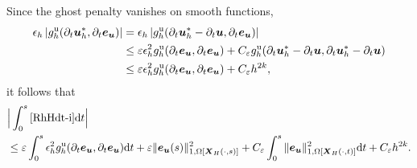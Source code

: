 \documentclass[11pt,reqno]{amsart}
\theoremstyle{definition}
\theoremstyle{plain}
\numberwithin{theorem}{section}
\numberwithin{proposition}{section}
\numberwithin{lemma}{section}
\numberwithin{equation}{section}
\newcommand{\bs}[1]{\boldsymbol{#1}}
\newcommand{\uu}[1]  {{\bs{#1}} }
\newcommand{\dep}{{{\bs{d}}}}
\def\d{\mathrm{d}}
\newcommand{\bu}{\uu{u}}
\renewcommand{\(}{\bigl(}
\renewcommand{\)}{\bigr)}
\begin{document}
Since the ghost penalty vanishes on smooth functions,
\begin{align*}
\epsilon_h
\left|
g_h^{\rm u}(\partial_t{\bs u}_h^*,\partial_t{\bs e}_{\bs u})
\right|
&=
\epsilon_h
\left|
g_h^{\rm u}(\partial_t{\bs u}_h^*-\partial_t{\bs u},
             \partial_t{\bs e}_{\bs u})
\right|
\\
&\leq 
\varepsilon \epsilon_h^2 
g_h^{\rm u}(\partial_t{\bs e}_{\bs u},\partial_t{\bs e}_{\bs u})
+ C_\varepsilon  g_h^{\rm u}(\partial_t{\bs u}_h^*-\partial_t{\bs u},\partial_t{\bs u}_h^*-\partial_t{\bs u}) \\
&\leq \varepsilon \epsilon_h^2 g_h^{\rm u}(\partial_t{\bs e}_{\bs u},\partial_t{\bs e}_{\bs u})
+ C_\varepsilon h^{2k} ,
\end{align*}
it follows that
\begin{align}
&\Big| \int_0^s \eqref{RhHdt-i}\d t \Big| \notag\\
&\leq 
\varepsilon\int_0^s \epsilon_h^2
g_h^{\rm u}(\partial_t{\bs e}_{\bs u},\partial_t{\bs e}_{\bs u}) \d t  +
\varepsilon 
\|{\bs e}_{\bs u}(s)\|_{1,\Omega[{\bs X}_H(\cdot,s)]}^2 
+ C_\varepsilon\int_0^s
\|{\bs e}_{\bs u}\|_{1,\Omega[{\bs X}_H(\cdot,t)]}^2 \d t
+ C_\varepsilon h^{2k} .
\end{align}
\end{document}
